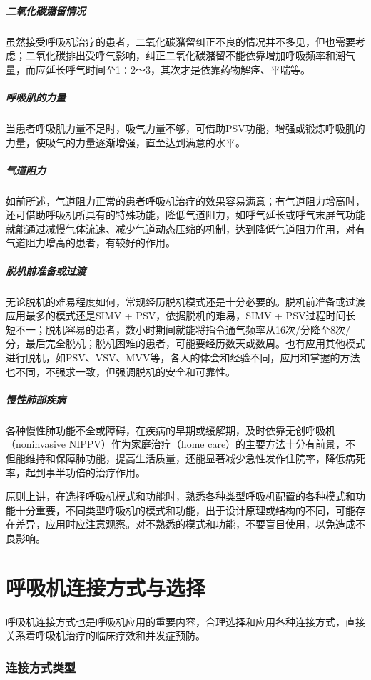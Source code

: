 \subparagraph{二氧化碳潴留情况}

虽然接受呼吸机治疗的患者，二氧化碳潴留纠正不良的情况并不多见，但也需要考虑；二氧化碳排出受呼气影响，纠正二氧化碳潴留不能依靠增加呼吸频率和潮气量，而应延长呼气时间至1∶2～3，其次才是依靠药物解痉、平喘等。

\subparagraph{呼吸肌的力量}

当患者呼吸肌力量不足时，吸气力量不够，可借助PSV功能，增强或锻炼呼吸肌的力量，使吸气的力量逐渐增强，直至达到满意的水平。

\subparagraph{气道阻力}

如前所述，气道阻力正常的患者呼吸机治疗的效果容易满意；有气道阻力增高时，还可借助呼吸机所具有的特殊功能，降低气道阻力，如呼气延长或呼气末屏气功能就能通过减慢气体流速、减少气道动态压缩的机制，达到降低气道阻力作用，对有气道阻力增高的患者，有较好的作用。

\subparagraph{脱机前准备或过渡}

无论脱机的难易程度如何，常规经历脱机模式还是十分必要的。脱机前准备或过渡应用最多的模式还是SIMV
+ PSV，依据脱机的难易，SIMV +
PSV过程时间长短不一；脱机容易的患者，数小时期间就能将指令通气频率从16次/分降至8次/分，最后完全脱机；脱机困难的患者，可能要经历数天或数周。也有应用其他模式进行脱机，如PSV、VSV、MVV等，各人的体会和经验不同，应用和掌握的方法也不同，不强求一致，但强调脱机的安全和可靠性。

\subparagraph{慢性肺部疾病}

各种慢性肺功能不全或障碍，在疾病的早期或缓解期，及时依靠无创呼吸机（noninvasive
NIPPV）作为家庭治疗（home
care）的主要方法十分有前景，不但能维持和保障肺功能，提高生活质量，还能显著减少急性发作住院率，降低病死率，起到事半功倍的治疗作用。

原则上讲，在选择呼吸机模式和功能时，熟悉各种类型呼吸机配置的各种模式和功能十分重要，不同类型呼吸机的模式和功能，出于设计原理或结构的不同，可能存在差异，应用时应注意观察。对不熟悉的模式和功能，不要盲目使用，以免造成不良影响。

\protect\hypertarget{text00369.html}{}{}

\section{呼吸机连接方式与选择}

呼吸机连接方式也是呼吸机应用的重要内容，合理选择和应用各种连接方式，直接关系着呼吸机治疗的临床疗效和并发症预防。

\subsubsection{连接方式类型}

